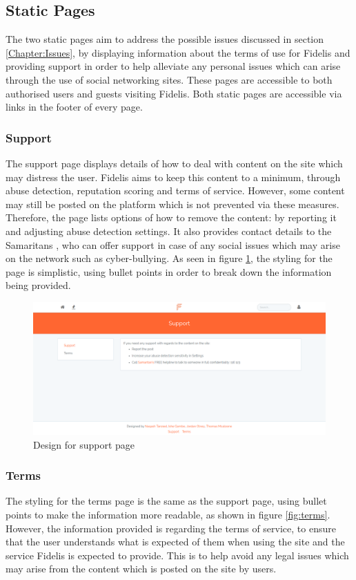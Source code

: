 \subsection{Static Pages}
The two static pages aim to address the possible issues discussed in section \ref{Chapter:Issues}, by displaying information about the terms of use for Fidelis and providing support in order to help alleviate any personal issues which can arise through the use of social networking sites. These pages are accessible to both authorised users and guests visiting Fidelis. Both static pages are accessible via links in the footer of every page.

\subsubsection{Support}
The support page displays details of how to deal with content on the site which may distress the user. Fidelis aims to keep this content to a minimum, through abuse detection, reputation scoring and terms of service. However, some content may still be posted on the platform which is not prevented via these measures. Therefore, the page lists options of how to remove the content: by reporting it and adjusting abuse detection settings. It also provides contact details to the Samaritans \cite{Samaritans:Home}, who can offer support in case of any social issues which may arise on the network such as cyber-bullying. As seen in figure \ref{fig:support}, the styling for the page is simplistic, using bullet points in order to break down the information being provided.

\begin{figure}[H]
\centering
\includegraphics[height=2in]{Images/Design/support-page}
\caption{Design for support page}
\label{fig:support}
\end{figure}

\subsubsection{Terms}
The styling for the terms page is the same as the support page, using bullet points to make the information more readable, as shown in figure \ref{fig:terms}. However, the information provided is regarding the terms of service, to ensure that the user understands what is expected of them when using the site and the service Fidelis is expected to provide. This is to help avoid any legal issues which may arise from the content which is posted on the site by users.

